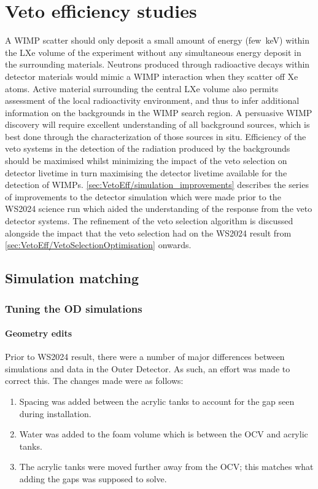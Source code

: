 \chapter{Veto efficiency studies}\label{chap:VetoEfficiency}
A WIMP scatter should only deposit a small amount of energy (few~keV) within the LXe volume of the experiment without any simultaneous energy deposit in the surrounding materials. Neutrons produced through radioactive decays within detector materials would mimic a WIMP interaction when they scatter off Xe atoms. Active material surrounding the central LXe volume also permits assessment of the local radioactivity environment, and thus to infer additional information on the backgrounds in the WIMP search region. A persuasive WIMP discovery will require excellent understanding of all background sources, which is best done through the characterization of those sources in situ. Efficiency of the veto systems in the detection of the radiation produced by the backgrounds should be maximised whilst minimizing the impact of the veto selection on detector livetime in turn maximising the detector livetime available for the detection of WIMPs. \autoref{sec:VetoEff/simulation_improvements} describes the series of improvements to the detector simulation which were made prior to the WS2024 science run which aided the understanding of the response from the veto detector systems. The refinement of the veto selection algorithm is discussed alongside the impact that the veto selection had on the WS2024 result from \autoref{sec:VetoEff/VetoSelectionOptimisation} onwards.

\section{Simulation matching}\label{sec:VetoEff/simulation_improvements}
\subsection{Tuning the OD simulations}
\subsubsection{Geometry edits}\label{sec:VetoEff/GeometryEdits}
Prior to WS2024 result, there were a number of major differences between simulations and data in the Outer Detector. As such, an effort was made to correct this. The changes made were as follows:
\begin{enumerate}
	\item Spacing was added between the acrylic tanks to account for the gap seen during installation.
	\item Water was added to the foam volume which is between the OCV and acrylic tanks.
	\item The acrylic tanks were moved further away from the OCV; this matches what adding the gaps was supposed to solve.
\end{enumerate}

